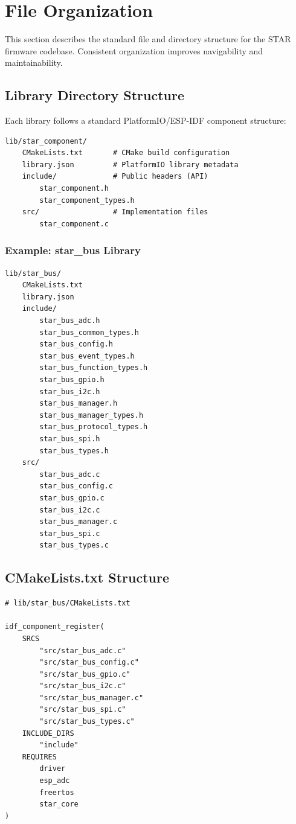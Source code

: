 \section{File Organization}

This section describes the standard file and directory structure for the STAR firmware codebase. Consistent organization improves navigability and maintainability.

\subsection{Library Directory Structure}

Each library follows a standard PlatformIO/ESP-IDF component structure:

\begin{verbatim}
lib/star_component/
    CMakeLists.txt       # CMake build configuration
    library.json         # PlatformIO library metadata
    include/             # Public headers (API)
        star_component.h
        star_component_types.h
    src/                 # Implementation files
        star_component.c
\end{verbatim}

\subsubsection{Example: star\_bus Library}

\begin{verbatim}
lib/star_bus/
    CMakeLists.txt
    library.json
    include/
        star_bus_adc.h
        star_bus_common_types.h
        star_bus_config.h
        star_bus_event_types.h
        star_bus_function_types.h
        star_bus_gpio.h
        star_bus_i2c.h
        star_bus_manager.h
        star_bus_manager_types.h
        star_bus_protocol_types.h
        star_bus_spi.h
        star_bus_types.h
    src/
        star_bus_adc.c
        star_bus_config.c
        star_bus_gpio.c
        star_bus_i2c.c
        star_bus_manager.c
        star_bus_spi.c
        star_bus_types.c
\end{verbatim}

\subsection{CMakeLists.txt Structure}

\begin{lstlisting}
# lib/star_bus/CMakeLists.txt

idf_component_register(
    SRCS
        "src/star_bus_adc.c"
        "src/star_bus_config.c"
        "src/star_bus_gpio.c"
        "src/star_bus_i2c.c"
        "src/star_bus_manager.c"
        "src/star_bus_spi.c"
        "src/star_bus_types.c"
    INCLUDE_DIRS
        "include"
    REQUIRES
        driver
        esp_adc
        freertos
        star_core
)
\end{lstlisting}

